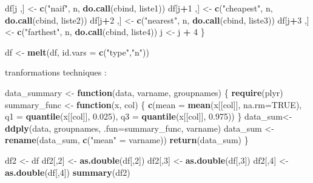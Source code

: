 \documentclass[
]{article}
\newenvironment{Shaded}{\begin{snugshade}}{\end{snugshade}}
\newcommand{\AttributeTok}[1]{\textcolor[rgb]{0.13,0.29,0.53}{#1}}
\newcommand{\ConstantTok}[1]{\textcolor[rgb]{0.56,0.35,0.01}{#1}}
\newcommand{\ControlFlowTok}[1]{\textcolor[rgb]{0.13,0.29,0.53}{\textbf{#1}}}
\newcommand{\DecValTok}[1]{\textcolor[rgb]{0.00,0.00,0.81}{#1}}
\newcommand{\FloatTok}[1]{\textcolor[rgb]{0.00,0.00,0.81}{#1}}
\newcommand{\FunctionTok}[1]{\textcolor[rgb]{0.13,0.29,0.53}{\textbf{#1}}}
\newcommand{\NormalTok}[1]{#1}
\newcommand{\OtherTok}[1]{\textcolor[rgb]{0.56,0.35,0.01}{#1}}
\newcommand{\SpecialCharTok}[1]{\textcolor[rgb]{0.81,0.36,0.00}{\textbf{#1}}}
\newcommand{\StringTok}[1]{\textcolor[rgb]{0.31,0.60,0.02}{#1}}
\begin{document}
\begin{Shaded}
\begin{Highlighting}[]
\NormalTok{  df[j ,] }\OtherTok{\textless{}{-}} \FunctionTok{c}\NormalTok{(}\StringTok{"naif"}\NormalTok{, n, }\FunctionTok{do.call}\NormalTok{(cbind, liste1))}
\NormalTok{  df[j}\SpecialCharTok{+}\DecValTok{1}\NormalTok{ ,] }\OtherTok{\textless{}{-}} \FunctionTok{c}\NormalTok{(}\StringTok{"cheapest"}\NormalTok{, n, }\FunctionTok{do.call}\NormalTok{(cbind, liste2))}
\NormalTok{  df[j}\SpecialCharTok{+}\DecValTok{2}\NormalTok{ ,] }\OtherTok{\textless{}{-}} \FunctionTok{c}\NormalTok{(}\StringTok{"nearest"}\NormalTok{, n, }\FunctionTok{do.call}\NormalTok{(cbind, liste3))}
\NormalTok{  df[j}\SpecialCharTok{+}\DecValTok{3}\NormalTok{ ,] }\OtherTok{\textless{}{-}} \FunctionTok{c}\NormalTok{(}\StringTok{"farthest"}\NormalTok{, n, }\FunctionTok{do.call}\NormalTok{(cbind, liste4))}
\NormalTok{  j }\OtherTok{\textless{}{-}}\NormalTok{ j }\SpecialCharTok{+} \DecValTok{4}
\NormalTok{\}}

\NormalTok{df }\OtherTok{\textless{}{-}} \FunctionTok{melt}\NormalTok{(df, }\AttributeTok{id.vars =} \FunctionTok{c}\NormalTok{(}\StringTok{"type"}\NormalTok{,}\StringTok{"n"}\NormalTok{))}
\end{Highlighting}
\end{Shaded}

tranformations techniques :

\begin{Shaded}
\begin{Highlighting}[]
\NormalTok{data\_summary }\OtherTok{\textless{}{-}} \ControlFlowTok{function}\NormalTok{(data, varname, groupnames)}
\NormalTok{\{}
  \FunctionTok{require}\NormalTok{(plyr)}
\NormalTok{  summary\_func }\OtherTok{\textless{}{-}} \ControlFlowTok{function}\NormalTok{(x, col)}
\NormalTok{  \{}
    \FunctionTok{c}\NormalTok{(}\AttributeTok{mean =} \FunctionTok{mean}\NormalTok{(x[[col]], }\AttributeTok{na.rm=}\ConstantTok{TRUE}\NormalTok{),}
      \AttributeTok{q1 =} \FunctionTok{quantile}\NormalTok{(x[[col]], }\FloatTok{0.025}\NormalTok{), }\AttributeTok{q3 =} \FunctionTok{quantile}\NormalTok{(x[[col]], }\FloatTok{0.975}\NormalTok{))}
\NormalTok{  \}}
\NormalTok{  data\_sum}\OtherTok{\textless{}{-}}\FunctionTok{ddply}\NormalTok{(data, groupnames, }\AttributeTok{.fun=}\NormalTok{summary\_func,}
\NormalTok{                  varname)}
\NormalTok{  data\_sum }\OtherTok{\textless{}{-}} \FunctionTok{rename}\NormalTok{(data\_sum, }\FunctionTok{c}\NormalTok{(}\StringTok{"mean"} \OtherTok{=}\NormalTok{ varname))}
  \FunctionTok{return}\NormalTok{(data\_sum)}
\NormalTok{\}}

\NormalTok{df2 }\OtherTok{\textless{}{-}}\NormalTok{ df}
\NormalTok{df2[,}\DecValTok{2}\NormalTok{] }\OtherTok{\textless{}{-}} \FunctionTok{as.double}\NormalTok{(df[,}\DecValTok{2}\NormalTok{])}
\NormalTok{df2[,}\DecValTok{3}\NormalTok{] }\OtherTok{\textless{}{-}} \FunctionTok{as.double}\NormalTok{(df[,}\DecValTok{3}\NormalTok{])}
\NormalTok{df2[,}\DecValTok{4}\NormalTok{] }\OtherTok{\textless{}{-}} \FunctionTok{as.double}\NormalTok{(df[,}\DecValTok{4}\NormalTok{])}
\FunctionTok{summary}\NormalTok{(df2)}
\end{Highlighting}
\end{Shaded}
\end{document}
